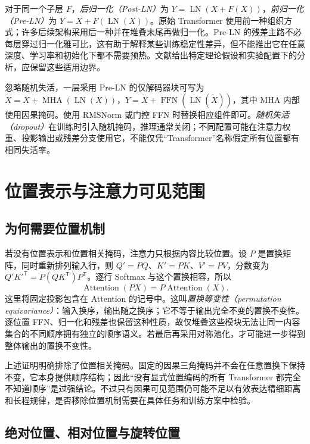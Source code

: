 \documentclass[UTF8,12pt,a4paper,fontset=fandol]{ctexart}
\begin{document}
对于同一个子层 $F$，\emph{后归一化（Post-LN）}为 $Y=\operatorname{LN}(X+F(X))$，\emph{前归一化（Pre-LN）}为 $Y=X+F(\operatorname{LN}(X))$。原始 Transformer 使用前一种组织方式；许多后续架构采用后一种并在堆叠末尾再做归一化。Pre-LN 的残差主路不必每层穿过归一化雅可比，这有助于解释某些训练稳定性差异，但不能推出它在任意深度、学习率和初始化下都不需要预热。文献\cite{xiong2020}给出特定理论假设和实验配置下的分析，应保留这些适用边界。

忽略随机失活，一层采用 Pre-LN 的仅解码器块可写为 $\widetilde X=X+\operatorname{MHA}(\operatorname{LN}(X))$，$Y=\widetilde X+\operatorname{FFN}(\operatorname{LN}(\widetilde X))$，其中 MHA 内部使用因果掩码。使用 RMSNorm 或门控 FFN 时替换相应组件即可。\emph{随机失活（dropout）}在训练时引入随机掩码，推理通常关闭；不同配置可能在注意力权重、投影输出或残差分支使用它，不能仅凭“Transformer”名称假定所有位置都有相同失活率。

\section{位置表示与注意力可见范围}
\label{sec:tr-position}

\subsection{为何需要位置机制}

若没有位置表示和位置相关掩码，注意力只根据内容比较位置。设 $P$ 是置换矩阵，同时重新排列输入行，则 $Q'=PQ$、$K'=PK$、$V'=PV$，分数变为 $Q'K'^{\mathsf T}=P(QK^{\mathsf T})P^{\mathsf T}$。逐行 Softmax 与这个置换相容，所以
\begin{equation}
\operatorname{Attention}(PX)=P\operatorname{Attention}(X).
\label{eq:tr-permutation}
\end{equation}
这里将固定投影包含在 Attention 的记号中。这叫\emph{置换等变性（permutation equivariance）}：输入换序，输出随之换序；它不等于输出完全不变的置换不变性。逐位置 FFN、归一化和残差也保留这种性质，故仅堆叠这些模块无法让同一内容集合的不同顺序拥有独立的顺序语义。若最后再采用对称池化，才可能进一步得到整体输出的置换不变性。

上述证明明确排除了位置相关掩码。固定的因果三角掩码并不会在任意置换下保持不变，它本身提供顺序结构；因此“没有显式位置编码的所有 Transformer 都完全不知道顺序”是过强结论。不过只有因果可见范围仍可能不足以有效表达精细距离和长程规律，是否移除位置机制需要在具体任务和训练方案中检验。

\subsection{绝对位置、相对位置与旋转位置}
\end{document}
